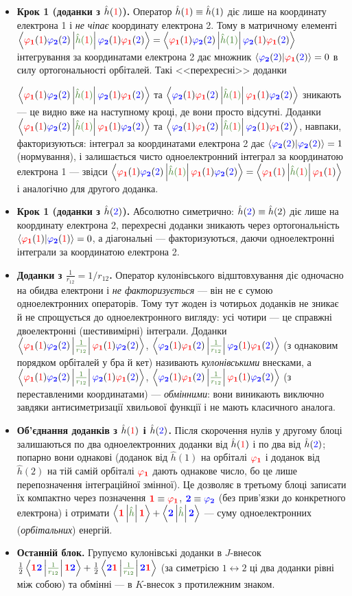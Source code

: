 \documentclass[]{article}
\def\opbracket#1#2#3{\left\langle #1\left| \textcolor{OliveGreen}{#2}\right|  #3 \right\rangle}
\let\vphi\varphi
\def\f{(\textcolor{red}{1})}
\def\s{(\textcolor{blue}{2})}
\def\F{\textcolor{red}{\mathbf{1}}}
\def\S{\textcolor{blue}{\mathbf{2}}}
\def\oa{\textcolor{red}{ \vphi_{\mathbf{1}}} }
\def\ob{\textcolor{blue}{ \vphi_{\mathbf{2}}} }
\def\h{\hat{h}}
\def\ha{\h\f}
\def\hb{\h\s}
\def\V{\frac{1}{r_{12}}}
\def\a{\oa\f \ob\s}
\def\b{\ob\f \oa\s}
\begin{document}
\begin{itemize}[leftmargin=1.4em]
    \item \textbf{Крок 1 (доданки з $\ha$).} Оператор $\ha\equiv\h(1)$ діє лише на координату електрона 1 і \emph{не чіпає} координату електрона 2. Тому в матричному елементі $\opbracket{\a}{\ha}{\b}=\opbracket{\oa\f\ob\s}{\h(1)}{\ob\f\oa\s}$ інтегрування за координатами електрона 2 дає множник $\langle\ob\s|\oa\s\rangle=0$ в силу ортогональності орбіталей. Такі <<перехресні>> доданки

     $\opbracket{\a}{\ha}{\b}$ та $\opbracket{\b}{\ha}{\a}$ зникають --- це видно вже на наступному кроці, де вони просто відсутні. Доданки $\opbracket{\a}{\ha}{\a}$ та $\opbracket{\b}{\ha}{\b}$, навпаки, факторизуються: інтеграл за координатами електрона 2 дає $\langle\ob\s|\ob\s\rangle=1$ (нормування), і залишається чисто одноелектронний інтеграл за координатою електрона 1 --- звідси $\opbracket{\a}{\ha}{\a}=\opbracket{\oa\f}{\ha}{\oa\f}$ і аналогічно для другого доданка.
    \item \textbf{Крок 1 (доданки з $\hb$).} Абсолютно симетрично: $\hb\equiv\h(2)$ діє лише на координату електрона 2, перехресні доданки зникають через ортогональність $\langle\oa\f|\ob\f\rangle=0$, а діагональні --- факторизуються, даючи одноелектронні інтеграли за координатою електрона 2.
    \item \textbf{Доданки з $\V=1/r_{12}$.} Оператор кулонівського відштовхування діє одночасно на обидва електрони і \emph{не факторизується} --- він не є сумою одноелектронних операторів. Тому тут жоден із чотирьох доданків не зникає й не спрощується до одноелектронного вигляду: усі чотири --- це справжні двоелектронні (шестивимірні) інтеграли. Доданки $\opbracket{\a}{\V}{\a}$, $\opbracket{\b}{\V}{\b}$ (з однаковим порядком орбіталей у бра й кет) називають \emph{кулонівськими} внесками, а $\opbracket{\a}{\V}{\b}$, $\opbracket{\b}{\V}{\a}$ (з переставленими координатами) --- \emph{обмінними}: вони виникають виключно завдяки антисиметризації хвильової функції і не мають класичного аналога.
    \item \textbf{Об'єднання доданків з $\ha$ і $\hb$.} Після скорочення нулів у другому блоці залишаються по два одноелектронних доданки від $\ha$ і по два від $\hb$; попарно вони однакові (доданок від $\h(1)$ на орбіталі $\oa$ і доданок від $\h(2)$ на тій самій орбіталі $\oa$ дають однакове число, бо це лише перепозначення інтеграційної змінної). Це дозволяє в третьому блоці записати їх компактно через позначення $\F\equiv\oa$, $\S\equiv\ob$ (без прив'язки до конкретного електрона) і отримати $\opbracket{\F}{\h}{\F}+\opbracket{\S}{\h}{\S}$ --- суму одноелектронних (\emph{орбітальних}) енергій.
    \item \textbf{Останній блок.} Групуємо кулонівські доданки в $J$-внесок $\frac12\opbracket{\F\S}{\V}{\F\S}+\frac12\opbracket{\S\F}{\V}{\S\F}$ (за симетрією $1\leftrightarrow2$ ці два доданки рівні між собою) та обмінні --- в $K$-внесок з протилежним знаком.
\end{itemize}
\end{document}
